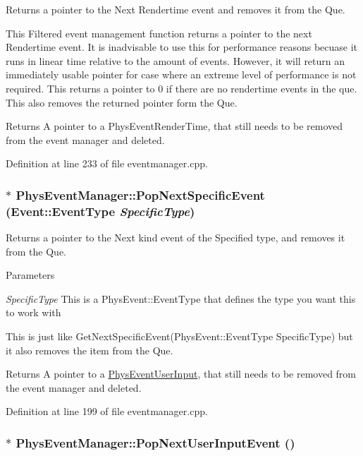 Returns a pointer to the Next Rendertime event and removes it from the Que. 

This Filtered event management function returns a pointer to the next Rendertime event. It is inadvisable to use this for performance reasons becuase it runs in linear time relative to the amount of events. However, it will return an immediately usable pointer for case where an extreme level of performance is not required. This returns a pointer to 0 if there are no rendertime events in the que. This also removes the returned pointer form the Que. \begin{DoxyReturn}{Returns}
A pointer to a PhysEventRenderTime, that still needs to be removed from the event manager and deleted. 
\end{DoxyReturn}


Definition at line 233 of file eventmanager.cpp.

\hypertarget{classPhysEventManager_ae1a12ccef3435f164472e6f8c38c77fe}{
\subsubsection[{PopNextSpecificEvent}]{ $\ast$ PhysEventManager::PopNextSpecificEvent ({\bf Event::EventType} {\em SpecificType})}}
\label{d5/dd7/classPhysEventManager_ae1a12ccef3435f164472e6f8c38c77fe}


Returns a pointer to the Next kind event of the Specified type, and removes it from the Que. 


\begin{DoxyParams}{Parameters}
\item[{\em SpecificType}]This is a PhysEvent::EventType that defines the type you want this to work with\end{DoxyParams}
This is just like GetNextSpecificEvent(PhysEvent::EventType SpecificType) but it also removes the item from the Que. \begin{DoxyReturn}{Returns}
A pointer to a \hyperlink{classPhysEventUserInput}{PhysEventUserInput}, that still needs to be removed from the event manager and deleted. 
\end{DoxyReturn}


Definition at line 199 of file eventmanager.cpp.

\hypertarget{classPhysEventManager_ad6612a6e1c728941e2c467e7f136ca51}{
\subsubsection[{PopNextUserInputEvent}]{ $\ast$ PhysEventManager::PopNextUserInputEvent ()}}
\label{d5/dd7/classPhysEventManager_ad6612a6e1c728941e2c467e7f136ca51}


